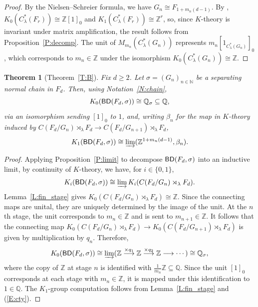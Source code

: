 \documentclass[11pt,a4,leqno]{amsart}
\newtheorem{thm}{Theorem}[section]
\theoremstyle{definition}
\theoremstyle{remark}
\numberwithin{equation}{section}
\theoremstyle{plain}
\newcommand{\Nb}{\mathbb{N}}
\newcommand{\Zb}{\mathbb{Z}}
\newcommand{\Qb}{\mathbb{Q}}
\newcommand{\BD}{{\sf{BD}}}
\begin{document}
\begin{proof}
    By the Nielsen--Schreier formula, we have $G_n \cong F_{1 + m_n(d-1)}$. By \cite[Corollary 3.2]{PimVoi82}, $K_0(C^*_\lambda(F_r)) \cong \Zb[1]_0$ and $K_1(C^*_\lambda(F_r)) \cong \Zb^r$, so, since $K$-theory is invariant under matrix amplification, the result follows from Proposition~\ref{P:decomp}. The unit of $M_{m_n}(C^*_\lambda(G_n))$ represents $m_n[1_{C^*_\lambda(G_n)}]_0$, which corresponds to $m_n \in \Zb$ under the isomorphism $K_0(C^*_\lambda(G_n))\cong \Zb$.  
\end{proof}

\begin{thm}[Theorem~\ref{T:B}]\label{T:Kthy}
    Fix $d\ge 2$. Let $\sigma = (G_n)_{n\in\Nb}$ be a separating normal chain in $F_d$. Then, using Notation~\ref{N:chain}, 
    \[
        K_0(\BD(F_d,\sigma)) \cong \Qb_\sigma \subseteq \Qb, 
    \]
    via an isomorphism sending $[1]_0$ to $1$, and, writing $\beta_n$ for the map in $K$-theory induced by $C(F_d/G_n)\rtimes_\lambda F_d \to C(F_d/G_{n+1})\rtimes_\lambda F_d$,
    \[
        K_1(\BD(F_d,\sigma)) \cong \varinjlim (\Zb^{1 + m_n(d-1)},\beta_n).
    \] 
\end{thm}

\begin{proof}
    Applying Proposition~\ref{P:limit} to decompose $\BD(F_d,\sigma)$ into an inductive limit, by continuity of $K$-theory, we have, for $i\in \{0,1\}$, 
    \begin{equation}\label{E:cty}
        K_i(\BD(F_d,\sigma)) \cong \varinjlim K_i(C(F_d/G_n)\rtimes_\lambda F_d).
    \end{equation}
    Lemma~\ref{L:fin_stage} gives $K_0(C(F_d/G_n)\rtimes_\lambda F_d) \cong \Zb$. Since the connecting maps are unital, they are uniquely determined by the image of the unit. At the $n$th stage, the unit corresponds to $m_n \in \Zb$ and is sent to $m_{n+1} \in \Zb$. It follows that the connecting map $K_0(C(F_d/G_{n})\rtimes_\lambda F_d) \to K_0(C(F_d/G_{n+1})\rtimes_\lambda F_d)$ is given by multiplication by $q_n$. Therefore, 
    \[
        K_0(\BD(F_d,\sigma)) \cong \varinjlim (\Zb \stackrel{\times q_1}{\longrightarrow} \Zb \stackrel{\times q_2}{\longrightarrow} \Zb \longrightarrow \cdots) \cong \Qb_\sigma,
    \]
    where the copy of $\Zb$ at stage $n$ is identified with $\frac{1}{m_n}\Zb \subseteq \Qb$. Since the unit $[1]_0$ corresponds at each stage with $m_n \in \Zb$, it is mapped under this identification to $1 \in \Qb$. The $K_1$-group computation follows from Lemma~\ref{L:fin_stage} and (\ref{E:cty}). 
\end{proof}
\end{document}
